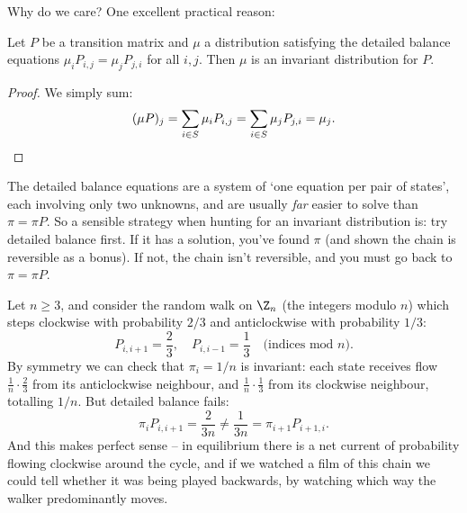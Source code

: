 \documentclass[a4paper]{scrartcl}
\begin{document}
\begin{center}
\end{center}

Why do we care? One excellent practical reason:

\begin{lemma}
	Let $P$ be a transition matrix and $\mu$ a distribution satisfying the detailed balance equations $\mu_i P_{i, j} = \mu_j P_{j, i}$ for all $i, j$. Then $\mu$ is an invariant distribution for $P$.
\end{lemma}
\begin{proof}
	We simply sum:
	$$
	(\mu P)_j = \sum_{i \in S} \mu_i P_{i, j} = \sum_{i \in S} \mu_j P_{j, i} = \mu_j. \qedhere
	$$
\end{proof}

The detailed balance equations are a system of `one equation per pair of states', each involving only two unknowns, and are usually \emph{far} easier to solve than $\pi = \pi P$. So a sensible strategy when hunting for an invariant distribution is: try detailed balance first. If it has a solution, you've found $\pi$ (and shown the chain is reversible as a bonus). If not, the chain isn't reversible, and you must go back to $\pi = \pi P$.

\begin{example}
	Let $n \geq 3$, and consider the random walk on $\Z_n$ (the integers modulo $n$) which steps clockwise with probability $2/3$ and anticlockwise with probability $1/3$:
	$$
	P_{i, i + 1} = \frac{2}{3}, \quad P_{i, i - 1} = \frac{1}{3} \quad \text{(indices mod } n).
	$$
	By symmetry we can check that $\pi_i = 1/n$ is invariant: each state receives flow $\frac{1}{n}\cdot\frac{2}{3}$ from its anticlockwise neighbour, and $\frac{1}{n} \cdot \frac{1}{3}$ from its clockwise neighbour, totalling $1/n$. But detailed balance fails:
	$$
	\pi_i P_{i, i + 1} = \frac{2}{3n} \neq \frac{1}{3n} = \pi_{i + 1}P_{i + 1, i}.
	$$
	And this makes perfect sense -- in equilibrium there is a net current of probability flowing clockwise around the cycle, and if we watched a film of this chain we could tell whether it was being played backwards, by watching which way the walker predominantly moves.
\end{example}
\end{document}
